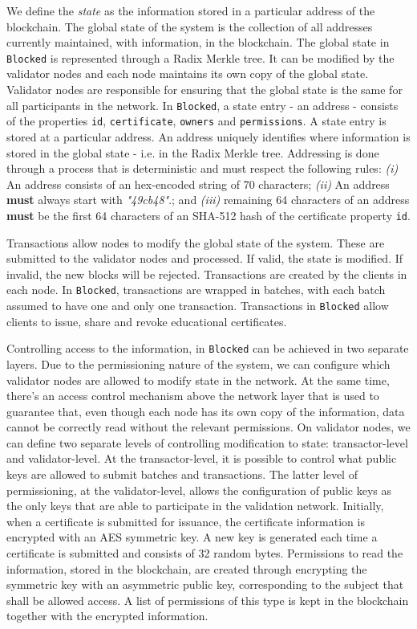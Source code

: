 We define the  \textit{state} as the information stored in a particular address of the blockchain. The global state of the system is the collection of all addresses currently maintained, with information, in the blockchain. The global state in \texttt{Blocked} is represented through a Radix Merkle tree. It can be modified by the validator nodes and each node maintains its own copy of the global state. Validator nodes are responsible for ensuring that the global state is the same for all participants in the network. In \texttt{Blocked}, a state entry - an address - consists of the properties \texttt{id}, \texttt{certificate}, \texttt{owners} and \texttt{permissions}. A state entry is stored at a particular address. An address uniquely identifies where information is stored in the global state - i.e. in the Radix Merkle tree. Addressing is done through a process that is deterministic and must respect the following rules: \emph{(i)} An address consists of an hex-encoded string of 70 characters; \emph{(ii)} An address \textbf{must} always start with \emph{"49cb48"}.; and \emph{(iii)} remaining 64 characters of an address \textbf{must} be the first 64 characters of an SHA-512 hash of the certificate property \texttt{id}.

Transactions allow nodes to modify the global state of the system. These are submitted to the validator nodes and processed. If valid, the state is modified. If invalid, the new blocks will be rejected. Transactions are created by the clients in each node. In \texttt{Blocked}, transactions are wrapped in batches, with each batch assumed to have one and only one transaction. Transactions in \texttt{Blocked} allow clients to issue, share and revoke educational certificates.

Controlling access to the information, in \texttt{Blocked} can be achieved in two separate layers. Due to the permissioning nature of the system, we can configure which validator nodes are allowed to modify state in the network. At the same time, there's an access control mechanism above the network layer that is used to guarantee that, even though each node has its own copy of the information, data cannot be correctly read without the relevant permissions. On validator nodes, we can define two separate levels of controlling modification to state: transactor-level and validator-level. At the transactor-level, it is possible to control what public keys are allowed to submit batches and transactions. The latter level of permissioning, at the validator-level, allows the configuration of public keys as the only keys that are able to participate in the validation network. Initially, when a certificate is submitted for issuance, the certificate information is encrypted with an AES symmetric key. A new key is generated each time a certificate is submitted and consists of 32 random bytes. Permissions to read the information, stored in the blockchain, are created through encrypting the symmetric key with an asymmetric public key, corresponding to the subject that shall be allowed access. A list of permissions of this type is kept in the blockchain together with the encrypted information.

